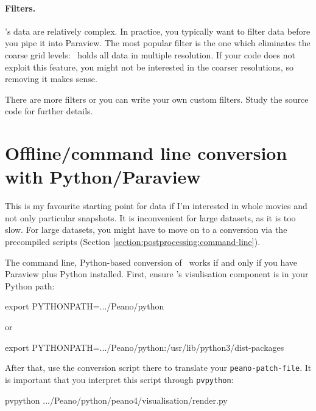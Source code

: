 \paragraph{Filters.}
%
%
%
\Peano's data are relatively complex.
In practice, you typically want to filter data before you pipe it into Paraview.
The most popular filter is the one which eliminates the coarse grid levels:
\Peano\ holds all data in multiple resolution.
If your code does not exploit this feature, you might not be interested in the 
coarser resolutions, so removing it makes sense.


There are more filters or you can write your own custom filters.
Study the source code for further details.



\section{Offline/command line conversion with Python/Paraview}
\label{label:postprocessing:convert-with-paraview}

\begin{remark}
 This is my favourite starting point for data if I'm interested in whole movies
 and not only particular snapshots. It is inconvenient for large datasets, as 
 it is too slow. For large datasets, you might have to move on to a conversion
 via the precompiled scripts (Section
 \ref{section:postprocessing:command-line}).
\end{remark}


\noindent
The command line, Python-based conversion of \Peano\ works if and only if you
have Paraview plus Python installed.
First, ensure \Peano's visulisation component is in your Python path:
\begin{code}
export PYTHONPATH=.../Peano/python  
\end{code}

\noindent
or

\begin{code}
export PYTHONPATH=.../Peano/python:/usr/lib/python3/dist-packages  
\end{code}


\noindent
After that, use the conversion script there to translate your
\texttt{peano-patch-file}. It is important that you interpret this script
through \texttt{pvpython}:

\begin{code}
pvpython .../Peano/python/peano4/visualisation/render.py 
\end{code}

